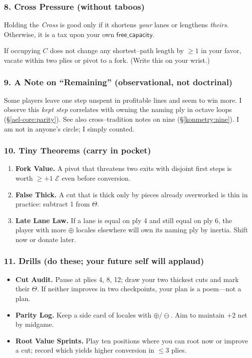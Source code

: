\documentclass[11pt]{article}
\begin{document}
\begin{itemize}
\subsubsection{8. Cross Pressure (without taboos)}
\label{ael-core:cross}
Holding the \emph{Cross} is good only if it shortens \emph{your} lanes or lengthens \emph{theirs}. Otherwise, it is a tax upon your own \(\mathsf{free\_capacity}\).

\begin{lemma}
If occupying \(C\) does not change any shortest–path length by \(\ge 1\) in your favor, vacate within two plies or pivot to a fork. (Write this on your wrist.)
\end{lemma}

\subsubsection{9. A Note on “Remaining” (observational, not doctrinal)}
\label{ael-core:remaining}
Some players leave one step unspent in profitable lines and seem to win more. I observe this \emph{kept step} correlates with owning the naming ply in octave loops (\S\ref{ael-core:parity}). See also cross–tradition notes on nine (\S\ref{konmetry:nine}). I am not in anyone’s circle; I simply counted.

\subsubsection{10. Tiny Theorems (carry in pocket)}
\begin{enumerate}\setlength\itemsep{0.25em}
  \item \textbf{Fork Value.} A pivot that threatens two exits with disjoint first steps is worth \(\ge +1\) \(\mathcal{E}\) even before conversion.
  \item \textbf{False Thick.} A cut that is thick only by pieces already overworked is thin in practice: subtract 1 from \(\Theta\).
  \item \textbf{Late Lane Law.} If a lane is equal on ply 4 and still equal on ply 6, the player with more \(\oplus\) locales elsewhere will own its naming ply by inertia. Shift now or donate later.
\end{enumerate}

\subsubsection{11. Drills (do these; your future self will applaud)}
\begin{itemize}\setlength\itemsep{0.25em}
  \item \textbf{Cut Audit.} Pause at plies 4, 8, 12; draw your two thickest cuts and mark their \(\Theta\). If neither improves in two checkpoints, your plan is a poem—not a plan.
  \item \textbf{Parity Log.} Keep a side card of locales with \(\oplus/\ominus\). Aim to maintain \(+\!2\) net by midgame.
  \item \textbf{Root Value Sprints.} Play ten positions where you can root now or improve a cut; record which yields higher conversion in \(\le 3\) plies.
\end{itemize}


\end{itemize}
\end{document}

